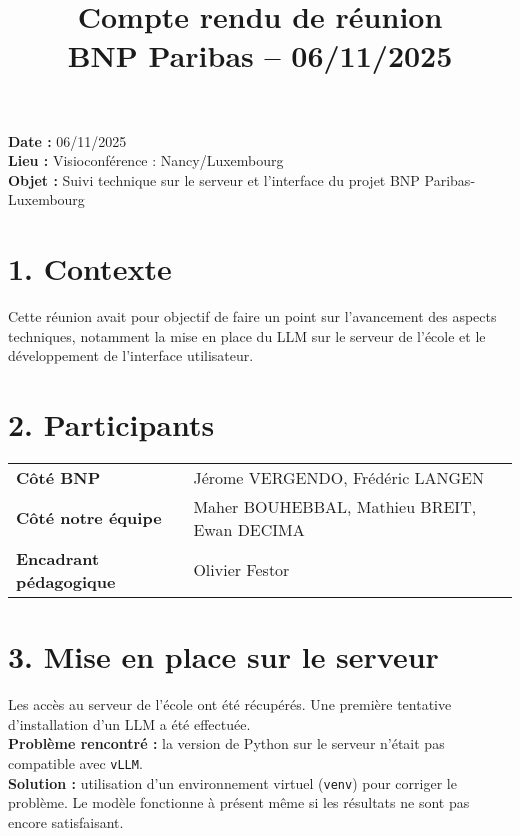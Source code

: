 \documentclass[a4paper,11pt]{article}
\title{\LARGE Compte rendu de réunion \\ \large BNP Paribas – 06/11/2025}
\date{}
\begin{document}
\maketitle

\begin{tcolorbox}[colback=blue!5!white,colframe=blue!75!black,title=Informations générales]
\textbf{Date :} 06/11/2025 \\
\textbf{Lieu :} Visioconférence : Nancy/Luxembourg \\
\textbf{Objet :} Suivi technique sur le serveur et l’interface du projet BNP Paribas-Luxembourg
\end{tcolorbox}

\vspace{0.5cm}

\section*{1. Contexte}
Cette réunion avait pour objectif de faire un point sur l’avancement des aspects techniques, notamment la mise en place du LLM sur le serveur de l’école et le développement de l’interface utilisateur.

\section*{2. Participants}
\begin{tcolorbox}[colback=gray!5!white,colframe=black!75!black,title=Participants]
\begin{tabular}{>{\bfseries}l l}
Côté BNP & Jérome VERGENDO, Frédéric LANGEN \\
Côté notre équipe & Maher BOUHEBBAL, Mathieu BREIT, Ewan DECIMA \\
Encadrant pédagogique & Olivier Festor
\end{tabular}
\end{tcolorbox}

\section*{3. Mise en place sur le serveur}
Les accès au serveur de l’école ont été récupérés. Une première tentative d’installation d’un LLM a été effectuée. \\
\textbf{Problème rencontré :} la version de Python sur le serveur n’était pas compatible avec \texttt{vLLM}. \\
\textbf{Solution :} utilisation d’un environnement virtuel (\texttt{venv}) pour corriger le problème. Le modèle fonctionne à présent même si les résultats ne sont pas encore satisfaisant.
\end{document}
